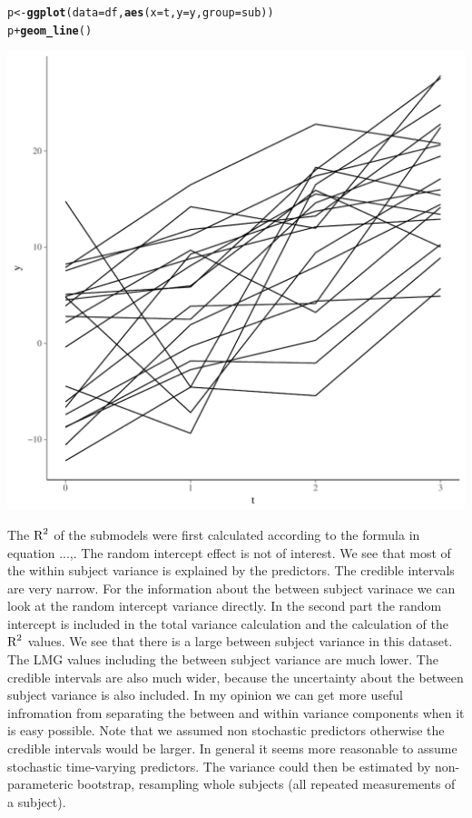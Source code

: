 \documentclass[11pt,a4paper,twoside]{book}\usepackage[]{graphicx}\usepackage[]{color}
\makeatletter
\def\maxwidth{ %
  \ifdim\Gin@nat@width>\linewidth
    \linewidth
  \else
    \Gin@nat@width
  \fi
}
\newcommand{\hlopt}[1]{\textcolor[rgb]{0,0,0}{#1}}%
\newcommand{\hlstd}[1]{\textcolor[rgb]{0.345,0.345,0.345}{#1}}%
\newcommand{\hlkwb}[1]{\textcolor[rgb]{0.69,0.353,0.396}{#1}}%
\newcommand{\hlkwc}[1]{\textcolor[rgb]{0.333,0.667,0.333}{#1}}%
\newcommand{\hlkwd}[1]{\textcolor[rgb]{0.737,0.353,0.396}{\textbf{#1}}}%
\newenvironment{kframe}{%
 \def\at@end@of@kframe{}%
 \ifinner\ifhmode%
  \def\at@end@of@kframe{\end{minipage}}%
  \begin{minipage}{\columnwidth}%
 \fi\fi%
 \def\FrameCommand##1{\hskip\@totalleftmargin \hskip-\fboxsep
 \colorbox{shadecolor}{##1}\hskip-\fboxsep
     \hskip-\linewidth \hskip-\@totalleftmargin \hskip\columnwidth}%
 \MakeFramed {\advance\hsize-\width
   \@totalleftmargin\z@ \linewidth\hsize
   \@setminipage}}%
 {\par\unskip\endMakeFramed%
 \at@end@of@kframe}
\newenvironment{knitrout}{}{} %
\makeatother
\begin{document}
\begin{knitrout}
\begin{kframe}
\begin{alltt}
\hlstd{p} \hlkwb{<-} \hlkwd{ggplot}\hlstd{(}\hlkwc{data} \hlstd{= df,} \hlkwd{aes}\hlstd{(}\hlkwc{x} \hlstd{= t,} \hlkwc{y} \hlstd{= y,} \hlkwc{group} \hlstd{= sub))}
\hlstd{p} \hlopt{+} \hlkwd{geom_line}\hlstd{()}
\end{alltt}
\end{kframe}
\includegraphics[width=\maxwidth]{figure/ch04_figsimdata_repeated-1} 

\end{knitrout}


The $\text{R}^2$ of the submodels were first calculated according to the formula in equation ...,. The random intercept effect is not of interest. We see that most of the within subject variance is explained by the predictors. The credible intervals are very narrow. For the information about the between subject varinace we can look at the random intercept variance directly. In the second part the random intercept is included in the total variance calculation and the calculation of the $\text{R}^2$ values. We see that there is a large between subject variance in this dataset. The LMG values including the between subject variance are much lower. The credible intervals are also much wider, because the uncertainty about the between subject variance is also included. In my opinion we can get more useful infromation from separating the between and within variance components when it is easy possible. Note that we assumed non stochastic predictors otherwise the credible intervals would be larger. In general it seems more reasonable to assume stochastic time-varying predictors. The variance could then be estimated by non-parameteric bootstrap, resampling whole subjects (all repeated measurements of a subject).
\end{document}
